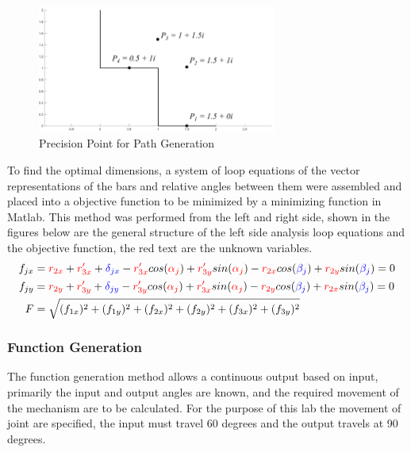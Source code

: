 \documentclass[12pt]{article}
\begin{document}
\begin{figure}[H]
    \centering
    \includegraphics[width=0.7\textwidth]{path_generation.png}
    \caption{Precision Point for Path Generation}
    \label{fig:precionpoints_PG}
\end{figure}
To find the optimal dimensions, a system of loop equations of the vector representations of the bars and relative angles between them were assembled and placed into a objective function to be minimized by a minimizing function in Matlab. This method was performed from the left and right side, shown in the figures below are the general structure of the left side analysis loop equations and the objective function, the red text are the unknown variables.
\begin{align}
    f_{jx}&=\color{red}r_{2x}\color{black}+\color{red}r'_{3x}\color{black}+\color{blue}\delta_{jx}\color{black}-\color{red}r'_{3x}\color{black}cos(\color{red}\alpha_j\color{black})+\color{red}r'_{3y}\color{black}sin(\color{red}\alpha_j\color{black})-\color{red}r_{2x}\color{black}cos(\color{blue}\beta_j\color{black})+\color{red}r_{2y}\color{black}sin(\color{blue}\beta_j\color{black})=0\\
    f_{jy}&=\color{red}r_{2y}\color{black}+\color{red}r'_{3y}\color{black}+\color{blue}\delta_{jy}\color{black}-\color{red}r'_{3y}\color{black}cos(\color{red}\alpha_j\color{black})+\color{red}r'_{3x}\color{black}sin(\color{red}\alpha_j\color{black})-\color{red}r_{2y}\color{black}cos(\color{blue}\beta_j\color{black})+\color{red}r_{2x}\color{black}sin(\color{blue}\beta_j\color{black})=0\\
    F&=\sqrt{(f_{1x})^2+(f_{1y})^2+(f_{2x})^2+(f_{2y})^2+(f_{3x})^2+(f_{3y})^2}
\end{align}

\subsubsection{Function Generation}
The function generation method allows a continuous output based on input, primarily the input and output angles are known, and the required movement of the mechanism are to be calculated. For the purpose of this lab the movement of joint are specified, the input must travel 60 degrees and the output travels at 90 degrees.
\end{document}
